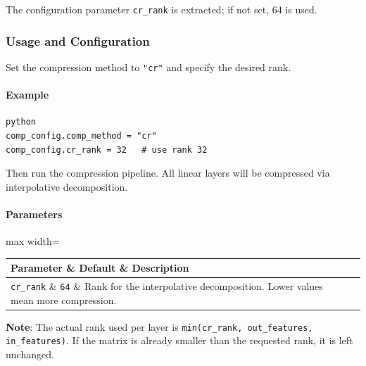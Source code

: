 The configuration parameter \texttt{cr\_rank} is extracted; if not set, 64 is used.


\subsubsection*{Usage and Configuration}

Set the compression method to \texttt{"cr"} and specify the desired rank.

\paragraph{Example}

\vspace{0.5em}
\begin{mdframed}[backgroundcolor=codebg, linecolor=codeframe, linewidth=1pt, roundcorner=4pt, innerleftmargin=2pt, innerrightmargin=5pt, innertopmargin=5pt, innerbottommargin=5pt]
\begin{lstlisting}
python
comp_config.comp_method = "cr"
comp_config.cr_rank = 32   # use rank 32
\end{lstlisting}
\end{mdframed}
\vspace{0.5em}

Then run the compression pipeline. All linear layers will be compressed via interpolative decomposition.

\paragraph{Parameters}

\begin{center}
\begin{adjustbox}{max width=\columnwidth}
\renewcommand{\arraystretch}{1.2}
\begin{tabular}{lll}
\toprule
Parameter \& Default \& Description \\
\midrule
\texttt{cr\_rank} \& \texttt{64} \& Rank for the interpolative decomposition. Lower values mean more compression. \\

\bottomrule
\end{tabular}
\end{adjustbox}
\end{center}
\textbf{Note}: The actual rank used per layer is \texttt{min(cr\_rank, out\_features, in\_features)}. If the matrix is already smaller than the requested rank, it is left unchanged.



